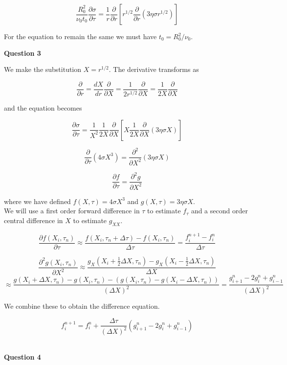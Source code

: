 \documentclass[12pt]{extarticle}
\begin{document}
$$\frac{R_0^2}{\nu_0 t_0}\frac{\partial \sigma}{\partial \tau}=\frac{1}{r}\frac{\partial}{\partial r}\left[r^{1/2}\frac{\partial }{\partial r}(3\eta\sigma r^{1/2}) \right]$$

For the equation to remain the same we must have $t_0 = R_0^2/\nu_0$.\\

\begin{center}
\textbf{Question 3}
\end{center}

We make the substitution $X = r^{1/2}$. The derivative transforms as

$$\frac{\partial}{\partial r} = \frac{dX}{dr}\frac{\partial }{\partial X} = \frac{1}{2r^{1/2}}\frac{\partial }{\partial X} = \frac{1}{2X}\frac{\partial }{\partial X} $$

and the equation becomes

$$\frac{\partial \sigma}{\partial \tau}=\frac{1}{X^2}\frac{1}{2X}\frac{\partial}{\partial X}\left[X\frac{1}{2X}\frac{\partial }{\partial X}(3\eta \sigma X) \right]$$

$$\frac{\partial}{\partial \tau} (4\sigma X^3)=\frac{\partial^2}{\partial X^2}  (3\eta \sigma X)$$

$$\frac{\partial f}{\partial \tau}=\frac{\partial^2 g}{\partial X^2} $$

where we have defined $f(X,\tau) = 4\sigma X^3$ and $g(X,\tau) = 3\eta \sigma X$.\\

We will use a first order forward difference in $\tau$ to estimate $f_{\tau}$ and a second order central difference in $X$ to estimate $g_{XX}$.

$$\frac{\partial f(X_i,\tau_n)}{\partial \tau}  \approx \frac{f(X_i,\tau_n + \Delta \tau) - f(X_i,\tau_n)}{\Delta \tau} = \frac{f_i^{n+1} - f_i^n}{\Delta \tau}$$

$$\frac{\partial^2 g(X_i,\tau_n)}{\partial X^2} \approx \frac{g_X(X_i+\frac{1}{2}\Delta X, \tau_n)-g_X(X_i-\frac{1}{2}\Delta X, \tau_n) }{\Delta X}$$
$$ \approx \frac{g(X_i+\Delta X, \tau_n)-g(X_i, \tau_n)-(g(X_i, \tau_n)-g(X_i-\Delta X, \tau_n))}{(\Delta X)^2} = \frac{g^n_{i+1}-2g^n_{i}+g^n_{i-1}}{(\Delta X)^2}$$

We combine these to obtain the difference equation.

$$f_i^{n+1} = f_i^n +\frac{\Delta \tau}{(\Delta X)^2}(g^n_{i+1}-2g^n_{i}+g^n_{i-1})$$\\

\begin{center}
\textbf{Question 4}
\end{center}
\end{document}
